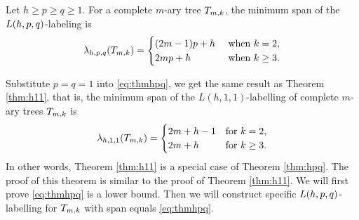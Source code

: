 \begin{theorem}
\label{thm:hpq}
Let $h \ge p \ge q \ge 1$. For a complete $m$-ary tree $T_{m,k}$, the minimum span of the $L(h,p,q)$-labeling is
\begin{align}
\label{eq:thmhpq}
\lambda_{h,p,q}(T_{m,k}) = 
 \begin{cases}
 (2m-1)p+h & \text{ when } k = 2, \\
 2mp+h & \text{ when } k \ge 3.
 \end{cases}
\end{align}
\end{theorem}

Substitute $p=q=1$ into \eqref{eq:thmhpq}, we get the same result as Theorem \ref{thm:h11}, that is, the minimum span of the $L(h,1,1)$-labelling of complete $m$-ary trees $T_{m,k}$ is
\begin{align*}
 \lambda_{h,1,1}(T_{m,k}) =
  \begin{cases}
   2m+h-1 & \text{for } k = 2, \\
   2m+h       & \text{for } k \ge 3.
  \end{cases}
 \end{align*}
In other words, Theorem \ref{thm:h11} is a special case of Theorem \ref{thm:hpq}. The proof of this theorem is similar to the proof of Theorem \ref{thm:h11}. We will first prove \eqref{eq:thmhpq} is a lower bound. Then we will construct specific $L(h,p,q)$-labelling for $T_{m,k}$ with span equals \eqref{eq:thmhpq}.  

